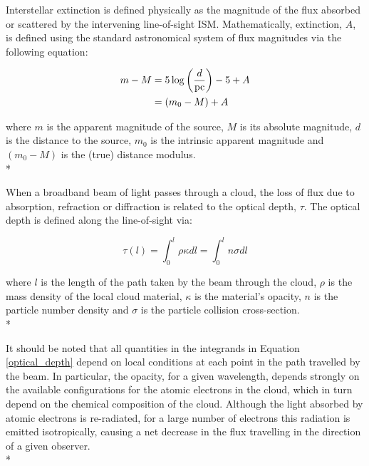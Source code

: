 \documentclass[12pt, a4paper]{report}
\begin{document}


Interstellar extinction is defined physically as the magnitude of the flux absorbed or scattered by the intervening line-of-sight ISM. Mathematically, extinction, $A$, is defined using the standard astronomical system of flux magnitudes via the following equation:

\begin{align}
\begin{split}
m - M &= 5\log\left(\frac{d}{\textnormal{pc}}\right) - 5 + A \\
      &= (m_{0} - M) + A
\end{split}
\label{ext_def_app_mag}
\end{align}

where $m$ is the apparent magnitude of the source, $M$ is its absolute magnitude, $d$ is the distance to the source, $m_{0}$ is the intrinsic apparent magnitude and $(m_{0} - M)$ is the (true) distance modulus. \\*

When a broadband beam of light passes through a cloud, the loss of flux due to absorption, refraction or diffraction is related to the optical depth, $\tau$. The optical depth is defined along the line-of-sight via:

\begin{equation}
\tau(l) = \int_{0}^{l} \rho \kappa dl = \int_{0}^{l} n \sigma dl
\label{optical_depth}
\end{equation}

where $l$ is the length of the path taken by the beam through the cloud, $\rho$ is the mass density of the local cloud material, $\kappa$ is the material's opacity, $n$ is the particle number density and $\sigma$ is the particle collision cross-section.\\*

It should be noted that all quantities in the integrands in Equation \ref{optical_depth} depend on local conditions at each point in the path travelled by the beam. In particular, the opacity, for a given wavelength, depends strongly on the available configurations for the atomic electrons in the cloud, which in turn depend on the chemical composition of the cloud. Although the light absorbed by atomic electrons is re-radiated, for a large number of electrons this radiation is emitted isotropically, causing a net decrease in the flux travelling in the direction of a given observer.\\*
\end{document}
